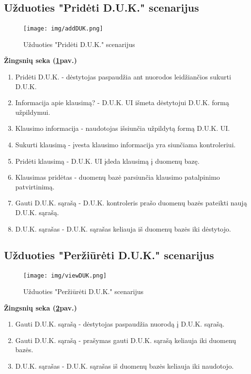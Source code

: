 \documentclass{VUMIFPSkursinis}
\begin{document}
\subsection{Užduoties "Pridėti D.U.K." scenarijus}
\begin{figure}[H]
	\centering
	\texttt{[image: img/addDUK.png]}
	\caption{Užduoties "Pridėti D.U.K." scenarijus}
	\label{fig:addDuk}
\end{figure}
\textbf{Žingsnių seka (\ref{fig:addDuk}pav.)}\\
\begin{enumerate}
	\item Pridėti D.U.K. - dėstytojas paspaudžia ant nuorodos leidžiančios sukurti D.U.K.
	\item Informacija apie klausimą? - D.U.K. UI išmeta dėstytojui D.U.K. formą užpildymui.
	\item Klausimo informacija - naudotojas išsiunčia užpildytą formą D.U.K. UI.
	\item Sukurti  klausimą - įvesta klausimo informacija yra siunčiama kontroleriui.
	\item Pridėti klausimą - D.U.K. UI įdeda klausimą į duomenų bazę.
	\item Klausimas pridėtas - duomenų bazė parsiunčia klausimo patalpinimo patvirtinimą.
	\item Gauti D.U.K. sąrašą - D.U.K. kontroleris prašo duomenų bazės pateikti naują D.U.K. sąrašą.
	\item D.U.K. sąrašas - D.U.K. sąrašas keliauja iš duomenų bazės iki dėstytojo.
\end{enumerate}
\subsection{Užduoties "Peržiūrėti D.U.K." scenarijus}
\begin{figure}[H]
	\centering
	\texttt{[image: img/viewDUK.png]}
	\caption{Užduoties "Peržiūrėti D.U.K." scenarijus}
	\label{fig:viewDUK}
\end{figure}
\textbf{Žingsnių seka (\ref{fig:viewDUK}pav.)}\\
\begin{enumerate}
	\item Gauti D.U.K. sąrašą - dėstytojas paspaudžia nuorodą į D.U.K. sąrašą.
	\item Gauti D.U.K. sąrašą - prašymas gauti D.U.K. sąrašą keliauja iki duomenų bazės.
	\item D.U.K. sąrašas - D.U.K. sąrašas iš duomenų bazės keliauja iki naudotojo.
\end{enumerate}
\end{document}
